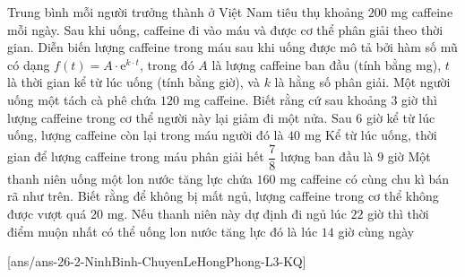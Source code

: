 \begin{ex}%
	Trung bình mỗi người trưởng thành ở Việt Nam tiêu thụ khoảng $200$ mg caffeine mỗi ngày. Sau khi uống, caffeine đi vào máu và được cơ thể phân giải theo thời gian. Diễn biến lượng caffeine trong máu sau khi uống được mô tả bởi hàm số mũ có dạng $f(t) = A \cdot \mathrm{e}^{k \cdot t}$, trong đó $A$ là lượng caffeine ban đầu (tính bằng mg), $t$ là thời gian kể từ lúc uống (tính bằng giờ), và $k$ là hằng số phân giải. Một người uống một tách cà phê chứa $120$ mg caffeine. Biết rằng cứ sau khoảng $3$ giờ thì lượng caffeine trong cơ thể người này lại giảm đi một nửa.
	{Sau $6$ giờ kể từ lúc uống, lượng caffeine còn lại trong máu người đó là $40$ mg}
	{\True Kể từ lúc uống, thời gian để lượng caffeine trong máu phân giải hết $\dfrac{7}{8}$ lượng ban đầu là $9$ giờ}
	{Một thanh niên uống một lon nước tăng lực chứa $160$ mg caffeine có cùng chu kì bán rã như trên. Biết rằng để không bị mất ngủ, lượng caffeine trong cơ thể không được vượt quá $20\text{ mg}$. Nếu thanh niên này dự định đi ngủ lúc $22$ giờ thì thời điểm muộn nhất có thể uống lon nước tăng lực đó là lúc $14$ giờ cùng ngày}
\end{ex}

[ans/ans-26-2-NinhBinh-ChuyenLeHongPhong-L3-KQ]
\caukq

